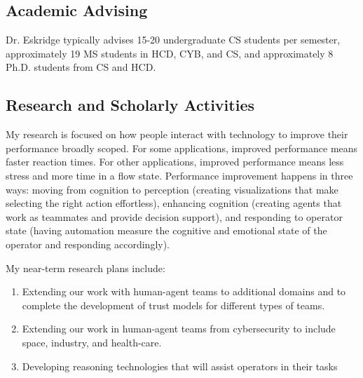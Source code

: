 \documentclass[12pt,letterpaper]{report}
\begin{document}

\subsection*{Academic Advising}

Dr. Eskridge  typically advises 15-20 undergraduate CS students per semester, approximately 19 MS students in HCD, CYB, and CS, and approximately 8 Ph.D. students from CS and HCD.

\subsection*{Research and Scholarly Activities}


My research is focused on how people interact with technology to improve their performance broadly scoped.  For some applications, improved performance means faster reaction times.  For other applications, improved performance means less stress and more time in a flow state.   Performance improvement happens in three ways:  moving from cognition to perception (creating visualizations that make selecting the right action effortless), enhancing cognition (creating agents that work as teammates and provide decision support), and responding to operator state (having automation measure the cognitive and emotional state of the operator and responding accordingly). 


My near-term research plans include:

\begin{enumerate}
\item Extending our work with human-agent teams to additional domains and to complete the development of trust models for different types of teams. 
\item Extending our work in human-agent teams from cybersecurity to include space, industry, and health-care.
\item Developing reasoning technologies that will assist operators in their tasks
\end{enumerate}
\end{document}
